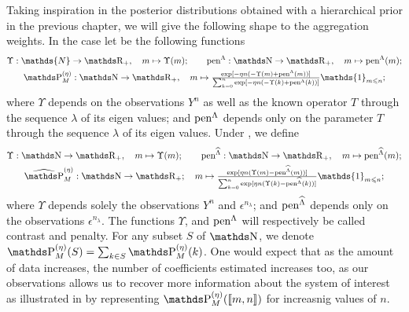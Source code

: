 Taking inspiration in the posterior distributions obtained with a hierarchical prior in the previous chapter, we will give the following shape to the aggregation weights.
In the case  let be the following functions
\begin{multline}\label{freq:ge:shape:kn:we}
\Upsilon : \mathds{N} \to \R_{+}, \quad m \mapsto \Upsilon(m); \qquad \pen^{\Lambda} : \N \to \R_{+}, \quad m \mapsto \pen^{\Lambda}(m);\\
\P_{M}^{(\eta)} : \N \to \R_{+}, \quad m \mapsto \tfrac{\exp[-\eta n (-\Upsilon(m) + \pen^{\Lambda}(m))]}{\sum\nolimits_{k = 0}^{n} \exp[-\eta n (-\Upsilon(k) + \pen^{\Lambda}(k))]} \mathds{1}_{m \leq n};
\end{multline}
where $\Upsilon$ depends on the observations $Y^{n}$ as well as the known operator $T$ through the sequence $\lambda$ of its eigen values; and $\operatorname{pen}^{\Lambda}$ depends only on the parameter $T$ through the sequence $\lambda$ of its eigen values.
Under , we define
\begin{multline}\label{freq:ge:shape:uk:we}
\Upsilon : \N \to \R_{+}, \quad m \mapsto \Upsilon(m); \qquad \pen^{\widehat{\Lambda}} : \N \to \R_{+}, \quad m \mapsto \pen^{\widehat{\Lambda}}(m);\\
\widehat{\P}_{M}^{(\eta)} : \N \to \R_{+}; \quad m \mapsto \tfrac{\exp[\eta n (\Upsilon(m) - \pen^{\widehat{\Lambda}}(m))]}{\sum\nolimits_{k = 0}^{n} \exp[\eta n (\Upsilon(k) - \pen^{\widehat{\Lambda}}(k))]} \mathds{1}_{m \leq n};
\end{multline}
where $\Upsilon$ depends solely the observations $Y^{n}$ and $\epsilon^{n_{\lambda}}$; and $\operatorname{pen}^{\widehat{\Lambda}}$ depends only on the observations $\epsilon^{n_{\lambda}}$.
The functions $\Upsilon$, and $\operatorname{pen}^{\Lambda}$ will respectively be called contrast and penalty.
For any subset $S$ of $\N$, we denote $\P_{M}^{(\eta)}(S) = \sum_{k \in S} \P_{M}^{(\eta)}(k)$.
One would expect that as the amount of data increases, the number of coefficients estimated increases too, as our observations allows us to recover more information about the system of interest as illustrated in  by representing $\P_{M}^{(\eta)}(\llbracket m, n \rrbracket)$ for increasnig values of $n$.

